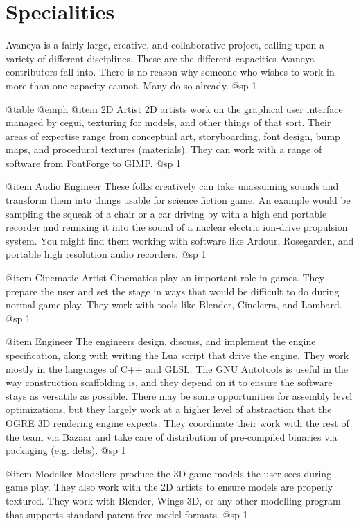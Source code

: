 \section{Specialities}
Avaneya is a fairly large, creative, and collaborative project, calling upon a variety of different disciplines. These are the different capacities Avaneya contributors fall into. There is no reason why someone who wishes to work in more than one capacity cannot. Many do so already.
@sp 1

@table @emph
@item 2D Artist
2D artists work on the graphical user interface managed by cegui, texturing for models, and other things of that sort. Their areas of expertise range from conceptual art, storyboarding, font design, bump maps, and procedural textures (materials). They can work with a range of software from FontForge to GIMP.
@sp 1

@item Audio Engineer
These folks creatively can take unassuming sounds and transform them into things usable for science fiction game. An example would be sampling the squeak of a chair or a car driving by with a high end portable recorder and remixing it into the sound of a nuclear electric ion-drive propulsion system. You might find them working with software like Ardour, Rosegarden, and portable high resolution audio recorders.
@sp 1

@item Cinematic Artist
Cinematics play an important role in games. They prepare the user and set the stage in ways that would be difficult to do during normal game play. They work with tools like Blender, Cinelerra, and Lombard.
@sp 1

@item Engineer
The engineers design, discuss, and implement the engine specification, along with writing the Lua script that drive the engine. They work mostly in the languages of C++ and GLSL. The GNU Autotools is useful in the way construction scaffolding is, and they depend on it to ensure the software stays as versatile as possible. There may be some opportunities for assembly level optimizations, but they largely work at a higher level of abstraction that the OGRE 3D rendering engine expects. They coordinate their work with the rest of the team via Bazaar and take care of distribution of pre-compiled binaries via packaging (e.g. debs).
@sp 1

@item Modeller
Modellers produce the 3D game models the user sees during game play. They also work with the 2D artists to ensure models are properly textured. They work with Blender, Wings 3D, or any other modelling program that supports standard patent free model formats.
@sp 1

